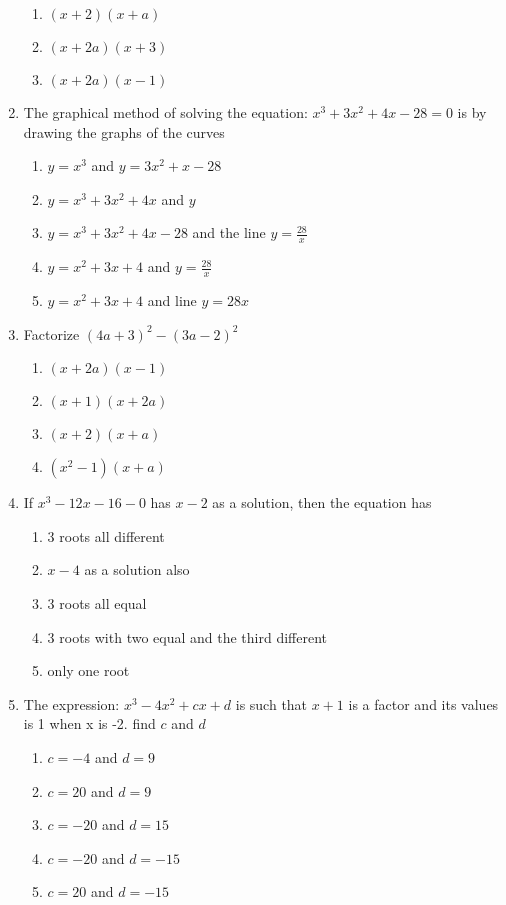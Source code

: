 \begin{multicols}{2}
\begin{enumerate}[label={\arabic*.}]
\begin{enumerate}[label={\Alph*.}]
	\item \((x+2)(x+a)\)
	\item \((x+2a)(x+3)\)
	\item \((x+2a)(x-1)\)
	\end{enumerate}
\item The graphical method of solving the equation: \(x^3+3x^2+4x-28 = 0\) is by drawing the graphs of the curves
	\begin{enumerate}[label={\Alph*.}]
	\item \(y = x^3\) and \(y=3x^2 + x -28\)
	\item \(y=x^3+3x^2+4x\) and \(y\)
	\item \(y=x^3+3x^2+4x-28\) and the line \(y=\frac{28}{x}\)
	\item \(y=x^2+3x+4\) and \(y=\frac{28}{x}\)
	\item \(y=x^2+3x+4\) and line \(y=28x\)
	\end{enumerate}
\item Factorize \((4a+3)^2-(3a-2)^2\)
	\begin{enumerate}[label={\Alph*.}]
	\item \((x+2a)(x-1)\)
	\item \((x+1)(x+2a)\)
	\item \((x+2)(x+a)\)
	\item \((x^2-1)(x+a)\)
	\end{enumerate}
\item If \(x^3 - 12x - 16 - 0\) has \(x-2\) as a solution, then the equation has
	\begin{enumerate}[label={\Alph*.}]
	\item 3 roots all different
	\item \(x-4\) as a solution also
	\item 3 roots all equal
	\item 3 roots with two equal and the third different
	\item only one root
	\end{enumerate}
\item The expression: \(x^3-4x^2+cx+d\) is such that \(x+1\) is a factor and its values is 1 when x is -2. find \(c\) and \(d\)
	\begin{enumerate}[label={\Alph*.}]
	\item \(c=-4\) and \(d=9\)
	\item \(c=20\) and \(d =9\)
	\item \(c=-20\) and \(d=15\)
	\item \(c=-20\) and \(d=-15\)
	\item \(c=20\) and \(d=-15\)

\end{enumerate}
\end{enumerate}
\end{multicols}
